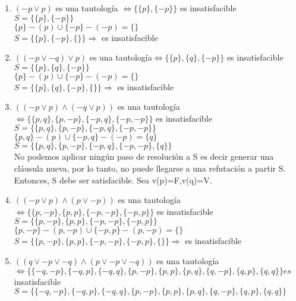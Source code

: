 \documentclass[10pt,a4paper]{article}
\begin{document}
  \subsubsection{}
    \begin{enumerate}
        \item $(-p \vee p)$ es una tautología $  \Leftrightarrow \{\{p\},\{-p\}\} $ es insatisfacible \\
        $S=\{\{p\},\{-p\}\}$ \\
        $\{p\}-(p) \cup \{-p\}-(-p)=\{\}$ \\
        $S=\{\{p\},\{-p\},\{\}\} \Rightarrow $ es insatisfacible
        \item $((-p \vee -q) \vee p) $ es una tautología$ \Leftrightarrow \{\{p\},\{q\},\{-p\}\} $ es insatisfacible \\
        $S=\{\{p\},\{q\},\{-p\}\}$ \\
        $\{p\}-(p) \cup \{-p\}-(-p)=\{\}$ \\
        $S=\{\{p\},\{q\},\{-p\},\{\}\} \Rightarrow $ es insatisfacible
        \item $((-p \vee p)\wedge(-q \vee p))$ es una tautología $ \Leftrightarrow \{\{p, q\},\{p, -p\},\{-p, q\},\{-p, -p\}\} $ es insatisfacible \\
        $S=\{\{p, q\},\{p, -p\},\{-p, q\},\{-p, -p\}\}$ \\
        $\{p, q\}-(p) \cup \{-p, q\}-(-p)=\{q\}$ \\
        $S=\{\{p, q\},\{p, -p\},\{-p, q\},\{-p, -p\},\{q\}\}$ \\
        No podemos aplicar ningún paso de resolución a S es decir generar una cláusula nueva, por lo tanto, no puede llegarse a una refutación a partir S. Entonces, S debe ser satisfacible. Sea v(p)=F,v(q)=V.
        \item $((-p \vee p)\wedge(p \vee -p))$ es una tautología $ \Leftrightarrow \{\{p, -p\},\{p, p\},\{-p, -p\},\{-p, p\}\} $ es insatisfacible \\
        $S=\{\{p, -p\},\{p, p\},\{-p, -p\},\{-p, p\}\}$ \\
        $\{p, -p\}-(p,-p) \cup \{-p, p\}-(p,-p)=\{\}$ \\
        $S=\{\{p, -p\},\{p, p\},\{-p, -p\},\{-p, p\},\{\}\} \Rightarrow $ es insatisfacible
        \item $((q \vee -p \vee -q)\wedge(p \vee -p \vee -q))$ es una tautología $ \Leftrightarrow \{\{-q, -p\},\{-q, p\},\{-q, q\},\{p, -p\},\{p, p\},\{p, q\},\{q, -p\},\{q, p\},\{q, q\}\} es$ insatisfacible
        $S=\{\{-q, -p\},\{-q, p\},\{-q, q\},\{p, -p\},\{p, p\},\{p, q\},\{q, -p\},\{q, p\},\{q, q\}\}$ \\

\end{enumerate}
\end{document}
